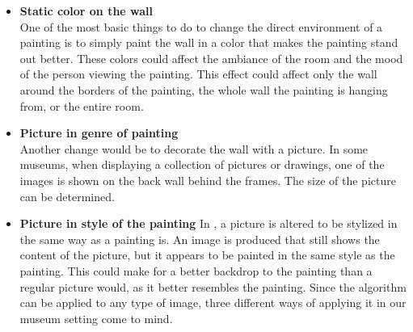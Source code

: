 \documentclass[a4paper]{article}
\begin{document}
\begin{itemize}

\item{\textbf{Static color on the wall}}
\\One of the most basic things to do to change the direct environment of a painting is to simply paint the wall in a color that makes the painting stand out better. These colors could affect the ambiance of the room and the mood of the person\cite{mood} viewing the painting. This effect could affect only the wall around the borders of the painting, the whole wall the painting is hanging from, or the entire room.

\item{\textbf{Picture in genre of painting}} 
\\Another change would be to decorate the wall with a picture. In some museums, when displaying a collection of pictures or drawings, one of the images is shown on the back wall behind the frames. The size of the picture can be determined. 


\item{\textbf{Picture in style of the painting}}
In \cite{gatys}, a picture is altered to be stylized in the same way as a painting is. An image is produced that still shows the content of the picture, but it appears to be painted in the same style as the painting. This could make for a better backdrop to the painting than a regular picture would, as it better resembles the painting. Since the algorithm can be applied to any type of image, three different ways of applying it in our museum setting come to mind. 


\end{itemize}
\end{document}
